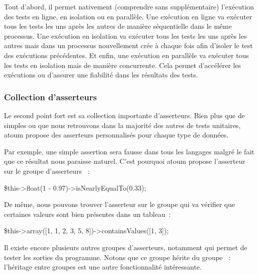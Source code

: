 Tout d'abord, il permet nativement (comprendre sans 
supplémentaire) l'exécution des tests en ligne, en isolation ou en parallèle.
Une exécution en ligne va exécuter tous les tests les uns après les autres de
manière séquentielle dans le même processus. Une exécution en isolation va
exécuter tous les tests les uns après les autres mais dans un processus
nouvellement crée à chaque fois afin d'isoler le test des exécutions
précédentes. Et enfin, une exécution en parallèle va exécuter tous les tests en
isolation mais de manière concurrente. Cela permet d'accélérer les exécutions ou
d'assurer une fiabilité dans les résultats des tests.

\subsubsection{Collection d'asserteurs}

Le second point fort est sa collection importante d'asserteurs. Bien plus que de
simples  ou  que nous retrouvons dans la
majorité des autres  de tests unitaires, atoum propose des
asserteurs personnalisés pour chaque type de données.

\begin{example}

Par exemple, une simple assertion  sera fausse dans tous
les langages malgré le fait que ce résultat nous paraisse naturel. C'est
pourquoi atoum propose l'asserteur  sur le groupe
d'asserteurs ~:
%
\begin{pre}
\$this->float(1 - 0.97)->isNearlyEqualTo(0.33);
\end{pre}
%
De même, nous pouvons trouver l'asserteur  sur le groupe
 qui va vérifier que certaines valeurs sont bien présentes dans un
tableau~:
%
\begin{pre}
\$this->array([1, 1, 2, 3, 5, 8])->containsValues([1, 3]);
\end{pre}
%
Il existe encore plusieurs autres groupes d'asserteurs, notamment 
qui permet de tester les sorties du programme. Notons que ce groupe hérite du
groupe ~: l'héritage entre groupes est une autre fonctionnalité
intéressante.

\end{example}

\subsubsection{}

